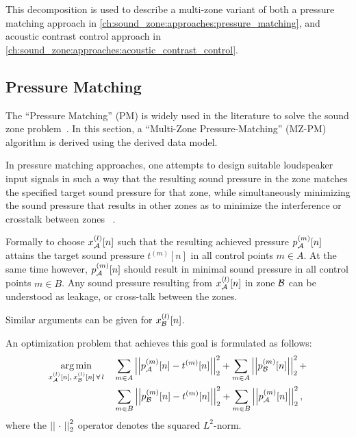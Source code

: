This decomposition is used to describe a multi-zone variant of both a pressure matching approach 
in \autoref{ch:sound_zone:approaches:pressure_matching},
and acoustic contrast control approach in \autoref{ch:sound_zone:approaches:acoustic_contrast_control}.

\subsection{Pressure Matching}
\label{ch:sound_zone:approaches:pressure_matching}
The ``Pressure Matching'' (PM) is widely used in the literature to solve the sound zone problem~\cite{betlehem2015personal, moller2016sound}.
In this section, a ``Multi-Zone Pressure-Matching'' (MZ-PM) algorithm is derived using the derived data model.

In pressure matching approaches, one attempts to design suitable loudspeaker input signals in such a way that the resulting sound pressure in the zone 
matches the specified target sound pressure for that zone, 
while simultaneously minimizing the sound pressure that results in other zones as to minimize the interference or crosstalk between zones
~\cite{betlehem2015personal, olik2013comparative}.

Formally to choose $x_{\mathcal{A}}^{(l)}[n]$ such that the resulting achieved pressure 
$p_{\mathcal{A}}^{(m)}[n]$ attains the target sound pressure $t^{(m)}[n]$ in all control points $m \in A$.   
At the same time however, $p_{\mathcal{A}}^{(m)}[n]$ should result in minimal sound pressure in all control points $m \in B$.
Any sound pressure resulting from $x_{\mathcal{A}}^{(l)}[n]$ in zone $\mathcal{B}$ can be understood as leakage, or cross-talk between the zones. 

Similar arguments can be given for $x_{\mathcal{B}}^{(l)}[n]$.

An optimization problem that achieves this goal is formulated as follows:
\begin{align}
    \begin{aligned}
        \argmin{x_\za^{(l)}[n],\,x_\zb^{(l)}[n]\,\forall\,l}{
           &\sum_{m\in A} \norm[2][2]{p_\za^{(m)}[n] - t^{(m)}[n]} +
            \sum_{m\in A} \norm[2][2]{p_\zb^{(m)}[n]} + \\
           &\sum_{m\in B} \norm[2][2]{p_\zb^{(m)}[n] - t^{(m)}[n]} + 
            \sum_{m\in B} \norm[2][2]{p_\za^{(m)}[n]}
        },
    \end{aligned}
\end{align}
where the $\norm[2][2]{\,\,\cdot\,\,}$ operator denotes the squared $L^2$-norm.

